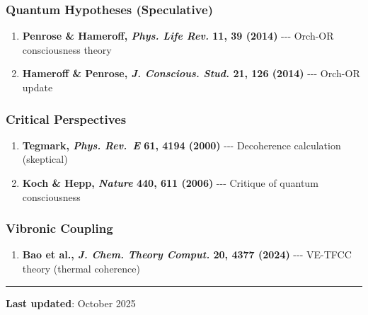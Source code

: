 \subsubsection{Quantum Hypotheses
(Speculative)}\label{quantum-hypotheses-speculative}

\begin{enumerate}
\def\labelenumi{\arabic{enumi}.}
\setcounter{enumi}{3}
\tightlist
\item
  \textbf{Penrose \& Hameroff, \emph{Phys. Life Rev.} 11, 39 (2014)}
  -\/-\/- Orch-OR consciousness theory
\item
  \textbf{Hameroff \& Penrose, \emph{J. Conscious. Stud.} 21, 126
  (2014)} -\/-\/- Orch-OR update
\end{enumerate}

\subsubsection{Critical Perspectives}\label{critical-perspectives}

\begin{enumerate}
\def\labelenumi{\arabic{enumi}.}
\setcounter{enumi}{5}
\tightlist
\item
  \textbf{Tegmark, \emph{Phys. Rev.~E} 61, 4194 (2000)} -\/-\/-
  Decoherence calculation (skeptical)
\item
  \textbf{Koch \& Hepp, \emph{Nature} 440, 611 (2006)} -\/-\/- Critique
  of quantum consciousness
\end{enumerate}

\subsubsection{Vibronic Coupling}\label{vibronic-coupling}

\begin{enumerate}
\def\labelenumi{\arabic{enumi}.}
\setcounter{enumi}{7}
\tightlist
\item
  \textbf{Bao et al., \emph{J. Chem. Theory Comput.} 20, 4377 (2024)}
  -\/-\/- VE-TFCC theory (thermal coherence)
\end{enumerate}

\begin{center}\rule{0.5\linewidth}{0.5pt}\end{center}

\textbf{Last updated}: October 2025
